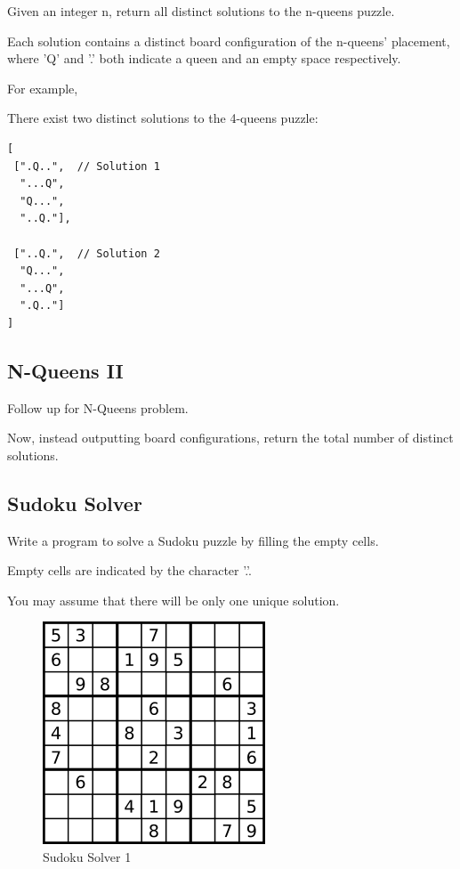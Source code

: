 \documentclass[12pt]{book}
\begin{document}
Given an integer n, return all distinct solutions to the n-queens puzzle.

Each solution contains a distinct board configuration of the n-queens' placement, where 'Q' and '.' both indicate a queen and an empty space respectively.

For example,

There exist two distinct solutions to the 4-queens puzzle:
\lstset{language=java,label= ,caption= ,numbers=none}
\begin{lstlisting}
[
 [".Q..",  // Solution 1
  "...Q",
  "Q...",
  "..Q."],

 ["..Q.",  // Solution 2
  "Q...",
  "...Q",
  ".Q.."]
]
\end{lstlisting}
\subsection{N-Queens II}
\label{sec-16-4-8}
Follow up for N-Queens problem.

Now, instead outputting board configurations, return the total number of distinct solutions.
\subsection{Sudoku Solver}
\label{sec-16-4-9}
Write a program to solve a Sudoku puzzle by filling the empty cells.

Empty cells are indicated by the character '.'.

You may assume that there will be only one unique solution.

\begin{figure}[htb]
\centering
\includegraphics[width=.9\linewidth]{./pic/solveSudoku1.png}
\caption{Sudoku Solver 1}
\end{figure}
\end{document}
